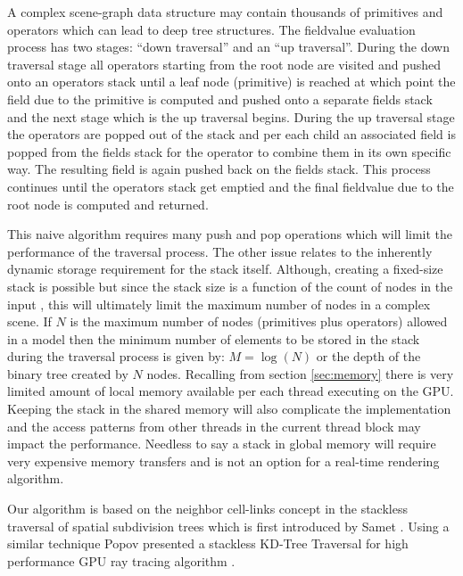 A complex \blob scene-graph data structure may contain thousands of primitives and operators which can lead to deep tree structures. The fieldvalue 
evaluation process has two stages: ``down traversal'' and an ``up traversal''. During the down traversal stage all operators starting from the root node 
are visited and pushed onto an operators stack until a leaf node (primitive) is reached at which point the field due to the primitive is computed and 
pushed onto a separate fields stack and the next stage which is the up traversal begins. During the up traversal stage the operators are popped out of 
the stack and per each child an associated field is popped from the fields stack for the operator to combine them in its own specific way. The resulting 
field is again pushed back on the fields stack.  This process continues until the operators stack get emptied and the final fieldvalue due to the root node is 
computed and returned.

This naive algorithm requires many push and pop operations which will limit the performance of the traversal process. The other issue relates to the 
inherently dynamic storage requirement for the stack itself. Although, creating a fixed-size stack is possible but since the stack size is a function of
the count of nodes in the input \blob, this will ultimately limit the maximum number of nodes in a complex scene. If $N$ is the maximum number of nodes 
(primitives plus operators) allowed in a \blob model then the minimum number of elements to be stored in the stack during the traversal process 
is given by: $M=\log(N)$ or the depth of the binary tree created by $N$ nodes. Recalling from section \ref{sec:memory} there is very limited amount of
local memory available per each thread executing on the GPU. Keeping the stack in the shared memory will also complicate the implementation and
the access patterns from other threads in the current thread block may impact the performance. Needless to say a stack in global memory will require very expensive 
memory transfers and is not an option for a real-time rendering algorithm. 

Our algorithm is based on the neighbor cell-links concept in the stackless traversal of spatial subdivision trees which is first introduced by Samet \etal 
\cite{Samet1984,Samet1990}. Using a similar technique Popov \etal presented a stackless KD-Tree Traversal for high performance GPU ray tracing algorithm \cite{Popov2007}.


